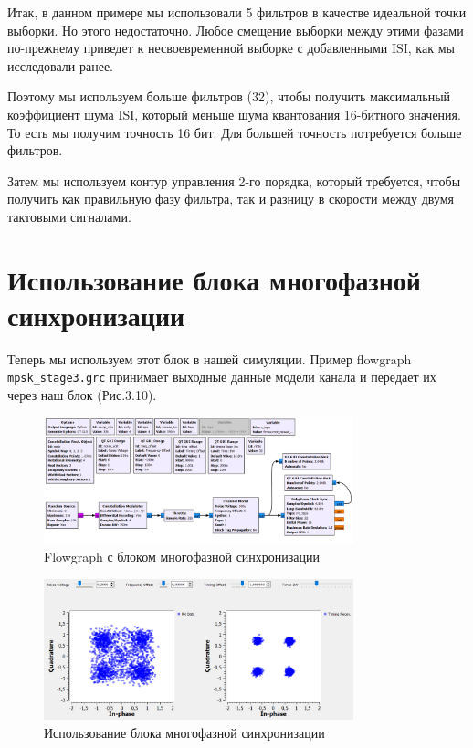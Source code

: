 \documentclass[a4paper,12pt]{report}
\begin{document}
    Итак, в данном примере мы использовали 5 фильтров в качестве идеальной точки выборки. Но этого недостаточно. Любое смещение выборки между этими фазами по-прежнему приведет к несвоевременной выборке с добавленными ISI, как мы исследовали ранее.
    
    Поэтому мы используем больше фильтров (32), чтобы получить максимальный коэффициент шума ISI, который меньше шума квантования 16-битного значения. То есть мы получим точность 16 бит. Для большей точность потребуется больше фильтров.
    
    Затем мы используем контур управления 2-го порядка, который требуется, чтобы получить как правильную фазу фильтра, так и разницу в скорости между двумя тактовыми сигналами.
    
\section{Использование блока многофазной синхронизации}
    Теперь мы используем этот блок в нашей симуляции. Пример flowgraph \texttt{mpsk\_stage3.grc} принимает выходные данные модели канала и передает их через наш блок (Рис.3.10).
\begin{figure}[H]
        \centering
        \includegraphics[width=0.8\textwidth]{fig3-10.PNG}
        \caption{Flowgraph с блоком многофазной синхронизации}
        \label{fig:fig3-10}
\end{figure}
\begin{figure}[H]
        \centering
        \includegraphics[width=0.8\textwidth]{fig3-11.PNG}
        \caption{Использование блока многофазной синхронизации}
        \label{fig:fig3-11}
\end{figure}
\end{document}
